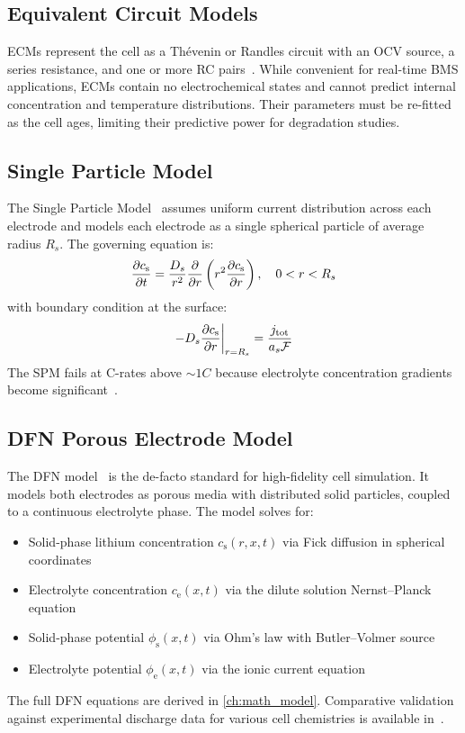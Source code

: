 \subsection{Equivalent Circuit Models}
\label{ssec:ecm}

ECMs represent the cell as a Thévenin or Randles circuit with an OCV source, a series resistance, and one or more RC pairs~\cite{Plett2004}. While convenient for real-time BMS applications, ECMs contain no electrochemical states and cannot predict internal concentration and temperature distributions. Their parameters must be re-fitted as the cell ages, limiting their predictive power for degradation studies.

\subsection{Single Particle Model}
\label{ssec:spm}

The Single Particle Model~\cite{Doyle1993,Scott1998} assumes uniform current distribution across each electrode and models each electrode as a single spherical particle of average radius $R_s$. The governing equation is:
\begin{equation}
  \dfrac{\partial c_\text{s}}{\partial t} = \frac{D_s}{r^2} \dfrac{\partial }{\partial r}\left(r^2 \dfrac{\partial c_\text{s}}{\partial r}\right), \quad 0 < r < R_s
  \label{eq:spm_solid_diff}
\end{equation}
with boundary condition at the surface:
\begin{equation}
  -D_s \dfrac{\partial c_\text{s}}{\partial r}\bigg|_{r=R_s} = \frac{j_\text{tot}}{a_s \mathcal{F}}
  \label{eq:spm_bc}
\end{equation}
The SPM fails at C-rates above $\sim 1C$ because electrolyte concentration gradients become significant~\cite{Moura2017}.

\subsection{DFN Porous Electrode Model}
\label{ssec:dfn}

The DFN model~\cite{Doyle1993,Fuller1994} is the de-facto standard for high-fidelity cell simulation. It models both electrodes as porous media with distributed solid particles, coupled to a continuous electrolyte phase. The model solves for:
\begin{itemize}
  \item Solid-phase lithium concentration $c_\text{s}(r,x,t)$ via Fick diffusion in spherical coordinates
  \item Electrolyte concentration $c_\text{e}(x,t)$ via the dilute solution Nernst--Planck equation
  \item Solid-phase potential $\phi_\text{s}(x,t)$ via Ohm's law with Butler--Volmer source
  \item Electrolyte potential $\phi_\text{e}(x,t)$ via the ionic current equation
\end{itemize}
The full DFN equations are derived in \cref{ch:math_model}. Comparative validation against experimental discharge data for various cell chemistries is available in~\cite{Doyle1996,Legrand2014}.

